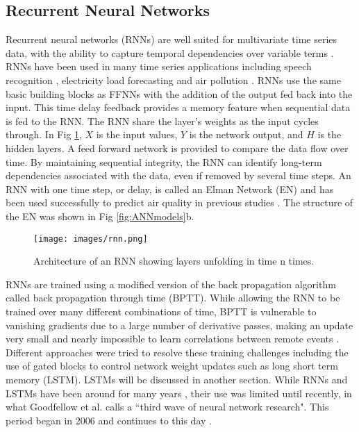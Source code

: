 \subsection{Recurrent Neural Networks}
Recurrent neural networks (RNNs) are well suited for multivariate time series data, with the ability to capture temporal dependencies over variable terms \citep{Che2016}. RNNs have been used in many time series applications including speech recognition \citep{Graves2013}, electricity load forecasting \citep{Walid2017} and air pollution \citep{Gomez2003}. RNNs use the same basic building blocks as FFNNs with the addition of the output fed back into the input. This time delay feedback provides a memory feature when sequential data is fed to the RNN. The RNN share the layer's weights as the input cycles through. In Fig \ref{fig:rnn}, $X$ is the input values, $Y$ is the network output, and $H$ is the hidden layers. A feed forward network is provided to compare the data flow over time. By maintaining sequential integrity, the RNN can identify long-term dependencies associated with the data, even if removed by several time steps. An RNN with one time step, or delay, is called an Elman Network (EN) and has been used successfully to predict air quality in previous studies \citep{Biancofiore2015, Biancofiore2017}. The structure of the EN was shown in Fig \ref{fig:ANNmodels}b.

%
\begin{figure}
\centering
\texttt{[image: images/rnn.png]}  %
\caption{Architecture of an RNN showing layers unfolding in time n times.}
\label{fig:rnn}
\end{figure}
%

RNNs are trained using a modified version of the back propagation algorithm called back propagation through time (BPTT). While allowing the RNN to be trained over many different combinations of time, BPTT is vulnerable to vanishing gradients due to a large number of derivative passes, making an update very small and nearly impossible to learn correlations between remote events \citep{Pascanu2013, Graves2013a}. Different approaches were tried to resolve these training challenges including the use of gated blocks to control network weight updates such as long short term memory (LSTM). LSTMs will be discussed in another section. While RNNs and LSTMs have been around for many years \cite{Hochreiter1997}, their use was limited until recently, in what Goodfellow et al. calls a ``third wave of neural network research". This period began in 2006 and continues to this day \citep{Goodfellow2016}.

